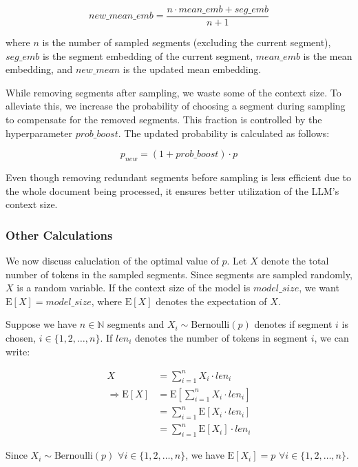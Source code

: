 			\[ new\_mean\_emb = \frac{n \cdot mean\_emb + seg\_emb}{n + 1} \]

			\noindent where $n$ is the number of sampled segments (excluding the current segment),
			$seg\_emb$ is the segment embedding of the current segment, $mean\_emb$ is the mean embedding,
			and $new\_mean$ is the updated mean embedding.

			While removing segments after sampling, we waste some of the context size.
			To alleviate this, we increase the probability of choosing a segment during sampling to
			compensate for the removed segments.
			This fraction is controlled by the hyperparameter $prob\_boost$.
			The updated probability is calculated as follows:
			
			\[ p_{new} = (1 + prob\_boost) \cdot p \]

			Even though removing redundant segments before sampling is less efficient due to the whole
			document being processed, it ensures better utilization of the LLM's context size.

		\subsubsection*{Other Calculations}
		
			We now discuss caluclation of the optimal value of $p$.
			Let $X$ denote the total number of tokens in the sampled segments.
			Since segments are sampled randomly, $X$ is a random variable.
			If the context size of the model is $model\_size$, we want $\mathrm{E}[X] = model\_size$,
			where $\mathrm{E}[X]$ denotes the expectation of $X$.

			Suppose we have $n \in \mathbb{N}$ segments and $X_i \sim \mathrm{Bernoulli}(p)$ denotes
			if segment $i$ is chosen, $i \in \{1, 2, \dots, n\}$.
			If $len_i$ denotes the number of tokens in segment $i$, we can write:

			\begin{align*}
				X &= \sum_{i = 1}^{n} X_i \cdot len_i \\
				\Rightarrow \mathrm{E}[X] &= \mathrm{E}[\sum_{i = 1}^{n} X_i \cdot len_i] \\
				&= \sum_{i = 1}^{n} \mathrm{E}[X_i \cdot len_i] \\
				&= \sum_{i = 1}^{n} \mathrm{E}[X_i] \cdot len_i
			\end{align*}

			Since $X_i \sim \mathrm{Bernoulli}(p)$ $\forall i \in \{1, 2, \dots, n\}$, we
			have $\mathrm{E}[X_i] = p$ $\forall i \in \{1, 2, \dots, n\}$.

